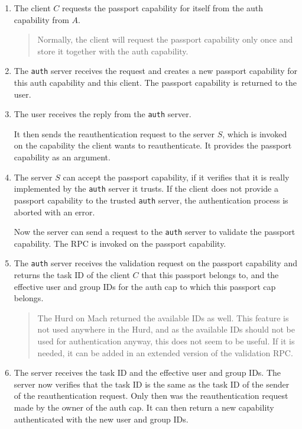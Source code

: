 \documentclass[9pt,a4paper]{extarticle}
\newenvironment{comment}{\footnotesize \begin{quote}}{\end{quote}}
\begin{document}
\begin{enumerate}
\item The client $C$ requests the passport capability for itself from
  the auth capability from $A$.

  \begin{comment}
    Normally, the client will request the passport capability only
    once and store it together with the auth capability.
  \end{comment}
  
\item The \texttt{auth} server receives the request and creates a new
  passport capability for this auth capability and this client.  The
  passport capability is returned to the user.
  
\item The user receives the reply from the \texttt{auth} server.
  
  It then sends the reauthentication request to the server $S$, which
  is invoked on the capability the client wants to reauthenticate.  It
  provides the passport capability as an argument.
  
\item The server $S$ can accept the passport capability, if it
  verifies that it is really implemented by the \texttt{auth} server
  it trusts.  If the client does not provide a passport capability to
  the trusted \texttt{auth} server, the authentication process is
  aborted with an error.
  
  Now the server can send a request to the \texttt{auth} server to
  validate the passport capability.  The RPC is invoked on the
  passport capability.
  
\item The \texttt{auth} server receives the validation request on the
  passport capability and returns the task ID of the client $C$ that
  this passport belongs to, and the effective user and group IDs for
  the auth cap to which this passport cap belongs.

  \begin{comment}
    The Hurd on Mach returned the available IDs as well.  This feature
    is not used anywhere in the Hurd, and as the available IDs should
    not be used for authentication anyway, this does not seem to be
    useful.  If it is needed, it can be added in an extended version
    of the validation RPC.
  \end{comment}
  
\item The server receives the task ID and the effective user and group
  IDs.  The server now verifies that the task ID is the same as the
  task ID of the sender of the reauthentication request.  Only then
  was the reauthentication request made by the owner of the auth cap.
  It can then return a new capability authenticated with the new user
  and group IDs.


\end{enumerate}
\end{document}
